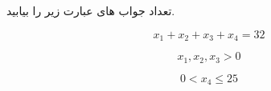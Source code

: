 \exercise
تعداد جواب های عبارت زیر را بیابید.

$$x_1 + x_2 + x_3 + x_4 = 32$$

$$x_1, x_2, x_3 > 0$$

$$0 < x_4 \leq 25$$